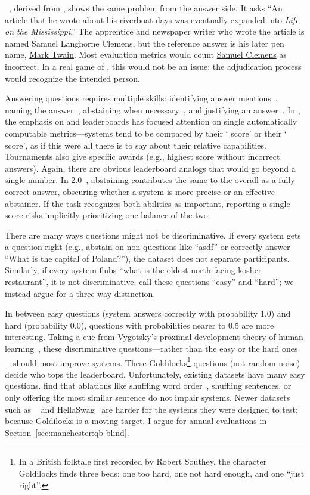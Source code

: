 \searchqa{}~\citep{dunn-17}, derived from \jeopardy{}, shows the same problem
from the answer side. It asks ``An article that he wrote about his riverboat
days was eventually expanded into \textit{Life on the Mississippi}.'' The
apprentice and newspaper writer who wrote the article is named Samuel Langhorne
Clemens, but the reference answer is his later pen name, \underline{Mark
Twain}. Most \qa{} evaluation metrics would count \underline{Samuel Clemens} as
incorrect. In a real game of \jeopardy{}, this would not be an issue: the
adjudication process would recognize the intended person.

Answering questions requires multiple skills: identifying answer
mentions~\citep{hermann-15}, naming the answer~\citep{yih-15}, abstaining when
necessary~\citep{rajpurkar-18}, and justifying an answer~\citep{fever-18}. In
\qa{}, the emphasis on  and leaderboards has focused attention on
single automatically computable metrics---systems tend to be compared by their
`\squad{} score' or their ` score', as if this were all there is to say
about their relative capabilities. Tournaments also give specific awards (e.g.,
highest score without incorrect answers). Again, there are obvious leaderboard
analogs that would go beyond a single number. In \squad{} 2.0~\citep{rajpurkar-18},
abstaining contributes the same to the overall \fone{} as a fully correct
answer, obscuring whether a system is more precise or an effective abstainer.
If the task recognizes both abilities as important, reporting a single score
risks implicitly prioritizing one balance of the two.

There are many ways questions might not be discriminative. If every system gets
a question right (e.g., abstain on non-questions like ``asdf'' or correctly
answer ``What is the capital of Poland?''), the dataset does not separate
participants. Similarly, if every system flubs ``what is the oldest
north-facing kosher restaurant'', it is not discriminative.
\citet{sugawara-18} call these questions ``easy'' and ``hard''; we instead
argue for a three-way distinction.

In between easy questions (system answers correctly with probability 1.0) and
hard (probability 0.0), questions with probabilities nearer to 0.5 are more
interesting. Taking a cue from Vygotsky's proximal development theory of human
learning~\citep{chaiklin-03}, these discriminative questions---rather than the
easy or the hard ones---should most improve  systems.
These Goldilocks\footnote{In a British folktale first recorded by Robert
Southey, the character Goldilocks finds three beds: one too hard, one not hard
enough, and one ``just right''.} questions (not random noise) decide who tops
the leaderboard. Unfortunately, existing datasets have many easy questions.
\citet{sugawara-20} find that ablations like shuffling word
order~\citep{Feng-18}, shuffling sentences, or only offering the most similar
sentence do not impair systems. Newer datasets such as ~\citep{dua-19}
and HellaSwag~\citep{zellers-19} are harder for the systems they were designed
to test; because Goldilocks is a moving target, I argue for annual evaluations
in Section~\ref{sec:manchester:qb-blind}.

